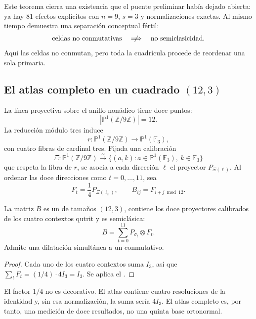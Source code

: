 \begin{bridgebox}
Este teorema cierra una existencia que el puente preliminar había dejado
abierta: ya hay 81 efectos explícitos con $n=9$, $s=3$ y normalizaciones
exactas. Al mismo tiempo demuestra una separación conceptual fértil:
\[
 \text{celdas no conmutativas}
 \quad\centernot\Longrightarrow\quad
 \text{no semiclasicidad}.
\]
Aquí las celdas no conmutan, pero toda la cuadrícula procede de reordenar una
sola \POVM primaria.
\end{bridgebox}

\subsection{El atlas completo en un cuadrado \texorpdfstring{$(12,3)$}{(12,3)}}

La línea proyectiva sobre el anillo nonádico tiene doce puntos:
\[
 |\mathbb P^1(\mathbb Z/9\mathbb Z)|=12.
 \tag{GMC-4.9}
\]
La reducción módulo tres induce
\[
 r:\mathbb P^1(\mathbb Z/9\mathbb Z)
 \longrightarrow\mathbb P^1(\mathbb F_3),
 \tag{GMC-4.10}
\]
con cuatro fibras de cardinal tres. Fijada una calibración
\[
 \Xi:\mathbb P^1(\mathbb Z/9\mathbb Z)
 \xrightarrow{\sim}
 \{(a,k):a\in\mathbb P^1(\mathbb F_3),\ k\in\mathbb F_3\}
 \tag{GMC-4.11}
\]
que respeta la fibra de $r$, se asocia a cada dirección $\ell$ el proyector
$P_{\Xi(\ell)}$. Al ordenar las doce direcciones como $t=0,\ldots,11$, sea
\[
 F_t=\frac14P_{\Xi(\ell_t)},
 \qquad
 B_{ij}=F_{i+j\bmod12}.
 \tag{GMC-4.12}
\]

\begin{theorem}
\label{p12-83-c22-s3:gmc:thm:qms-12-3}
La matriz $B$ es un \QMS de tamaños $(12,3)$, contiene los doce proyectores
calibrados de los cuatro contextos qutrit y es semiclásica:
\[
 B=\sum_{t=0}^{11}P_{\sigma_t}\otimes F_t.
 \tag{GMC-4.13}
\]
Admite una dilatación simultánea a un \QPM conmutativo.
\end{theorem}

\begin{proof}
Cada uno de los cuatro contextos suma $I_3$, así que
$\sum_tF_t=(1/4)\cdot4I_3=I_3$. Se aplica el
.
\end{proof}

El factor $1/4$ no es decorativo. El atlas contiene cuatro resoluciones de la
identidad y, sin esa normalización, la suma sería $4I_3$. El atlas completo
es, por tanto, una medición de doce resultados, no una quinta base
ortonormal.


